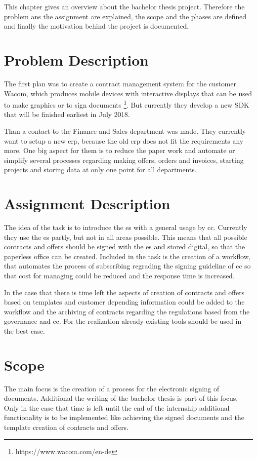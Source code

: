  This chapter gives an overview about the bachelor thesis project. Therefore the problem ans the assignment are explained, the scope and the phases are defined and finally the motivation behind the project is documented.
 
 \section{Problem Description}
 The first plan was to create a contract management system for the customer Wacom, which produces mobile devices with interactive displays that can be used to make graphics or to sign documents \footnote{https://www.wacom.com/en-de}. But currently they develop a new \gls{SDK} that will be finished earliest in July 2018.
 
 Than a contact to the Finance and Sales department was made. They currently want to setup a new \gls{erp}, because the old \gls{erp} does not fit the requirements any more. One big aspect for them is to reduce the paper work and automate or simplify several processes regarding making offers, orders and invoices, starting projects and storing data at only one point for all departments.

 \section{Assignment Description}
 The idea of the task is to introduce the \gls{es} with a general usage by \gls{cc}. Currently they use the \gls{es} partly, but not in all areas possible.
 This means that all possible contracts and offers should be signed with the \gls{es} and stored digital, so that the paperless office can be created. Included in the task is the creation of a workflow, that automates the process of subscribing regrading the signing guideline of \gls{cc} so that cost for managing could be reduced and the response time is increased.
 
 In the case that there is time left the aspects of creation of contracts and offers based on templates and customer depending information could be added to the workflow and the archiving of contracts regarding the regulations based from the governance and \gls{cc}. For the realization already existing tools should be used in the best case.
 
 \section{Scope}
 The main focus is the creation of a process for the electronic signing of documents. Additional the writing of the bachelor thesis is part of this focus. Only in the case that time is left until the end of the internship additional functionality is to be implemented like achieving the signed documents and the template creation of contracts and offers.
 
